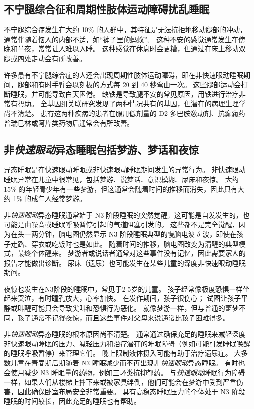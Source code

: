 \subsection{不宁腿综合征和周期性肢体运动障碍扰乱睡眠}

不宁腿综合症发生在大约 10\% 的人群中，其特征是无法抗拒地移动腿部的冲动，通常伴随着恼人的内部不适，如“裤子里的蚂蚁”。
这种不安的感觉通常发生在傍晚和半夜，常常让人难以入睡。
这种感觉在休息时会更糟，但通过在床上移动双腿或四处走动会有所改善。


许多患有不宁腿综合症的人还会出现周期性肢体运动障碍，即在非快速眼动睡眠期间，腿部和有时手臂会以刻板的方式每 20 到 40 秒弯曲一次。
这些腿部运动会打断睡眠，并可能导致白天困倦。
缺铁是导致腿不安的常见原因，用铁进行治疗非常有帮助。
全基因组关联研究发现了两种情况共有的基因，但潜在的病理生理学尚不清楚。
患有这两种疾病的患者在服用低剂量的 D2 多巴胺激动剂、抗癫痫药普瑞巴林或阿片类药物后通常会有所改善。



\subsection{非\textit{快速眼动}异态睡眠包括梦游、梦话和夜惊}

异态睡眠是在快速眼动睡眠或非快速眼动睡眠期间发生的异常行为。
非快速眼动睡眠异常在儿童中很常见，包括梦游、说梦话、意识模糊、尿床和夜惊。
大约 15\% 的年轻青少年有一些梦游，但这通常会随着时间的推移而消失，因此只有大约 1\% 的成年人经常梦游。


非\textit{快速眼动}异态睡眠通常始于 N3 阶段睡眠的突然觉醒，这可能是自发发生的，也可能是由噪音或睡眠呼吸暂停引起的气道阻塞引发的。
这些都不是完全觉醒，因为在头一两分钟，脑电图仍然显示 N3 阶段睡眠典型的慢脑电波 $ \delta $ 波，即使在孩子走路、穿衣或吃饭时也是如此。
随着时间的推移，脑电图改变为清醒的典型模式，最终个体醒来。
梦游者或说话者通常对这些事件没有记忆，因此需要家人的报告才能做出诊断。
尿床（遗尿）也可能发生在某些儿童的深度非快速眼动睡眠期间。


夜惊也发生在N3阶段的睡眠中，常见于2-5岁的儿童。
孩子经常像极度恐惧一样坐起来哭泣，有时瞳孔放大，心率加快。
在发作期间，孩子很伤心；
试图让孩子平静或叫醒可能只会导致尖叫和恐惧行为恶化。
就像梦游一样，但与普通的噩梦不同，孩子通常不记得夜惊，而且这些事件对父母来说通常比孩子困难得多。


非\textit{快速眼动}异态睡眠的根本原因尚不清楚。
通常通过确保充足的睡眠来减轻深度非快速眼动睡眠的压力、减轻压力和治疗潜在的睡眠障碍（例如可能引发睡眠唤醒的睡眠呼吸暂停）来管理它们。
晚上限制液体摄入可能有助于治疗遗尿症。
大多数儿童在青春期后期随着 N3 睡眠减少而不再出现非\textit{快速眼动}异态睡眠。
有时也会使用减少 N3 睡眠量的药物，例如三环类抗抑郁药。
与\textit{快速眼动}睡眠行为障碍一样，如果人们从楼梯上摔下来或被家具绊倒，他们可能会在梦游中受到严重伤害，因此确保卧室布局安全非常重要。
具有高稳态睡眠压力的个体处于 N3 阶段睡眠的时间较长，因此充足的睡眠也有帮助。



